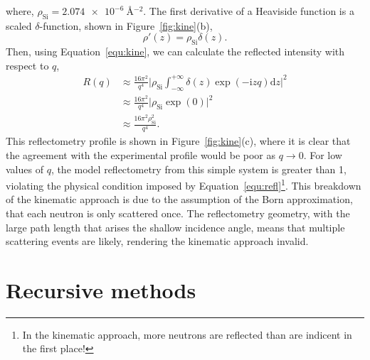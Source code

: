 \documentclass[twoside,symmetric]{tufte-handout}
\begin{document}
%
where, $\rho_{\text{Si}} = \SI{2.074e-6}{\angstrom^{-2}}$. 
The first derivative of a Heaviside function is a scaled $\delta$-function, shown in Figure~\ref{fig:kine}(b), 
%
\begin{equation}
    \rho'(z) = \rho_{\text{Si}}\delta(z).
\end{equation}
%
Then, using Equation~\ref{equ:kine}, we can calculate the reflected intensity with respect to $q$, 
%
\begin{equation}
    \begin{aligned}
    R(q) & \approx \frac{16\pi^2}{q^4} \bigg| \rho_{\text{Si}}\int^{+\infty}_{-\infty}{\delta(z)\exp{(-\mathrm{i} zq) \text{d}z}} \bigg|^2 \\ 
     & \approx \frac{16\pi^2}{q^4} \bigg| \rho_{\text{Si}} \exp{(0)} \bigg| ^2 \\
     & \approx \frac{16\pi^2\rho_{\text{Si}}^2}{q^4}.
    \end{aligned}
\end{equation}
%
This reflectometry profile is shown in Figure~\ref{fig:kine}(c), where it is clear that the agreement with the experimental profile would be poor as $q \to 0$.\cite{majkrzak_exact_1998}
For low values of $q$, the model reflectometry from this simple system is greater than \num{1}, violating the physical condition imposed by Equation~\ref{equ:refl}\footnote{In the kinematic approach, more neutrons are reflected than are indicent in the first place!}.
This breakdown of the kinematic approach is due to the assumption of the Born approximation, that each neutron is only scattered once. 
The reflectometry geometry, with the large path length that arises the shallow incidence angle, means that multiple scattering events are likely, rendering the kinematic approach invalid.

\section{Recursive methods}
\end{document}
